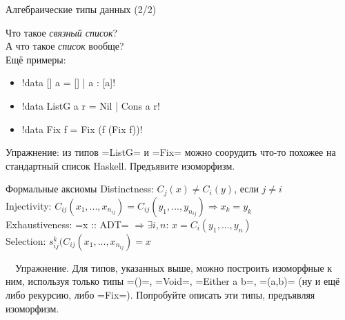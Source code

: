 \documentclass{beamer}
\begin{document}
\begin{frame}[fragile]{Алгебраические типы данных (2/2)}

{\Large \faQuestion} Что такое \textit{связный список}?\\ \pause
{\Large \faQuestion} А что такое \textit{список} вообще?\\ \pause
\vspace{1cm}
Ещё примеры:
\begin{itemize}
  \item \hsinline!data [] a = [] | a : [a]!
  \item \hsinline!data ListG a r = Nil | Cons a r!
  \item \hsinline!data Fix f = Fix (f (Fix f))! 
\end{itemize}
\vspace{1cm}
Упражнение: из типов \hsinline=ListG= и \hsinline=Fix= можно соорудить что-то похожее на стандартный список Haskell. Предъявите изоморфизм.
\end{frame}

\begin{frame}[fragile]{Формальные аксиомы}
Distinctness: $C_{j}(x) \neq C_{i}(y)$, если $j \neq i$\\
\vspace{1cm}
Injectivity:
$C_{ij}(x_1,...,x_{n_{ij}}) = C_{ij}(y_1,...,y_{n_{ij}}) \Rightarrow x_k = y_k$\\
\vspace{1cm}
Exhaustiveness: \hsinline=x :: ADT= 
$\Rightarrow \exists i, n$: $x = C_i(y_1,...,y_n)$\\
\vspace{1cm}
Selection:
$s^k_{ij}(C_{ij}(x_1,...,x_{n_{ij}}) = x$
\end{frame}

\begin{frame}
~\ Упражнение. Для типов, указанных выше, можно построить изоморфные к ним, используя только типы \inline=()=, \inline=Void=, \inline=Either a b=, \inline=(a,b)= (ну и ещё либо рекурсию, либо \inline=Fix=). Попробуйте описать эти типы, предъявляя изоморфизм.
\end{frame}
\end{document}
